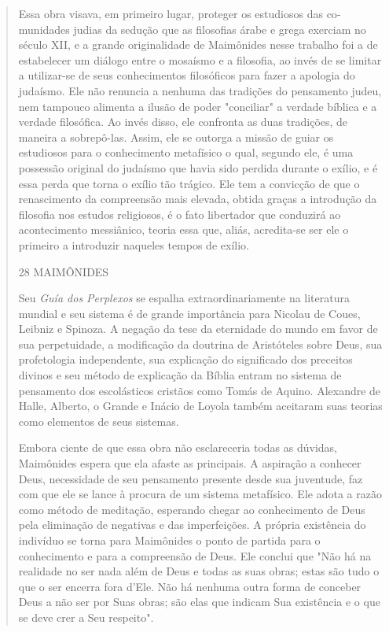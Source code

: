 \begin{quote}
Essa obra visava, em primeiro lugar, proteger os estudiosos das
co­munidades judias da sedução que as filosofias árabe e grega exerciam
no século XII, e a grande originalidade de Maimônides nesse trabalho foi
a de estabelecer um diálogo entre o mosaísmo e a filosofia, ao invés de
se limitar a utilizar-se de seus conhecimentos filosóficos para fazer a
apologia do judaísmo. Ele não renuncia a nenhuma das tradições do
pensamento judeu, nem tampouco ali­menta a ilusão de poder "conciliar" a
verdade bíblica e a verdade filosófica. Ao invés disso, ele confronta as
duas tradições, de maneira a sobrepô-las. As­sim, ele se outorga a
missão de guiar os estudiosos para o conhecimento meta­físico o qual,
segundo ele, é uma possessão original do judaísmo que havia sido perdida
durante o exílio, e é essa perda que torna o exílio tão trágico. Ele tem
a convicção de que o renascimento da compreensão mais elevada, obtida
gra­ças a introdução da filosofia nos estudos religiosos, é o fato
libertador que con­duzirá ao acontecimento messiânico, teoria essa que,
aliás, acredita-se ser ele o primeiro a introduzir naqueles tempos de
exílio.

28 MAIMÔNIDES

Seu \emph{Guía dos Perplexos} se espalha extraordinariamente na
literatura mundial e seu sistema é de grande importância para Nicolau de
Coues, Leibniz e Spinoza. A negação da tese da eternidade do mundo em
favor de sua perpe­tuidade, a modificação da doutrina de Aristóteles
sobre Deus, sua profetologia independente, sua explicação do significado
dos preceitos divinos e seu méto­do de explicação da Bíblia entram no
sistema de pensamento dos escolásticos cristãos como Tomás de Aquino.
Alexandre de Halle, Alberto, o Grande e Iná­cio de Loyola também
aceitaram suas teorias como elementos de seus sistemas.

Embora ciente de que essa obra não esclareceria todas as dúvidas,
Maimônides espera que ela afaste as principais. A aspiração a conhecer
Deus, necessidade de seu pensamento presente desde sua juventude, faz
com que ele se lance à procura de um sistema metafísico. Ele adota a
razão como método de meditação, esperando chegar ao conhecimento de Deus
pela eliminação de negativas e das imperfeições. A própria existência do
indivíduo se torna para Maimônides o ponto de partida para o
conhecimento e para a compreensão de Deus. Ele conclui que "Não há na
realidade no ser nada além de Deus e to­das as suas obras; estas são
tudo o que o ser encerra fora d'Ele. Não há nenhu­ma outra forma de
conceber Deus a não ser por Suas obras; são elas que indi­cam Sua
existência e o que se deve crer a Seu respeito".


\end{quote}
